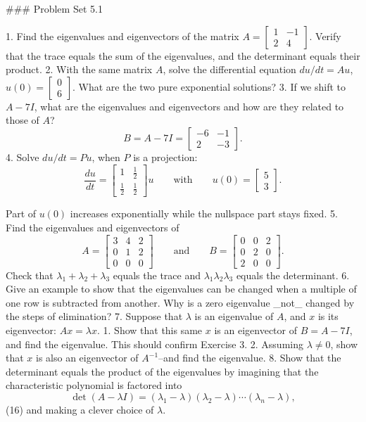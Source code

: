 

### Problem Set 5.1

1. Find the eigenvalues and eigenvectors of the matrix \(A=\left[\begin{smallmatrix}1&-1\\ 2&4\end{smallmatrix}\right]\). Verify that the trace equals the sum of the eigenvalues, and the determinant equals their product.
2. With the same matrix \(A\), solve the differential equation \(du/dt=Au\), \(u(0)=\left[\begin{smallmatrix}0\\ 6\end{smallmatrix}\right]\). What are the two pure exponential solutions?
3. If we shift to \(A-7I\), what are the eigenvalues and eigenvectors and how are they related to those of \(A\)? \[B=A-7I=\left[\begin{matrix}-6&-1\\ 2&-3\end{matrix}\right].\]
4. Solve \(du/dt=Pu\), when \(P\) is a projection: \[\frac{du}{dt}=\left[\begin{smallmatrix}1&\frac{1}{2}\\ \frac{1}{2}&\frac{1}{2}\end{smallmatrix}\right]u\qquad\text{with}\qquad u(0)= \left[\begin{matrix}5\\ 3\end{matrix}\right].\]

Part of \(u(0)\) increases exponentially while the nullspace part stays fixed.
5. Find the eigenvalues and eigenvectors of \[A=\left[\begin{matrix}3&4&2\\ 0&1&2\\ 0&0&0\end{matrix}\right]\qquad\text{and}\qquad B=\left[\begin{matrix}0&0&2\\ 0&2&0\\ 2&0&0\end{matrix}\right].\] Check that \(\lambda_{1}+\lambda_{2}+\lambda_{3}\) equals the trace and \(\lambda_{1}\lambda_{2}\lambda_{3}\) equals the determinant.
6. Give an example to show that the eigenvalues can be changed when a multiple of one row is subtracted from another. Why is a zero eigenvalue _not_ changed by the steps of elimination?
7. Suppose that \(\lambda\) is an eigenvalue of \(A\), and \(x\) is its eigenvector: \(Ax=\lambda x\). 1. Show that this same \(x\) is an eigenvector of \(B=A-7I\), and find the eigenvalue. This should confirm Exercise 3. 2. Assuming \(\lambda\neq 0\), show that \(x\) is also an eigenvector of \(A^{-1}\)--and find the eigenvalue.
8. Show that the determinant equals the product of the eigenvalues by imagining that the characteristic polynomial is factored into \[\det(A-\lambda I)=(\lambda_{1}-\lambda)(\lambda_{2}-\lambda)\cdots(\lambda_{n }-\lambda),\] (16) and making a clever choice of \(\lambda\).

